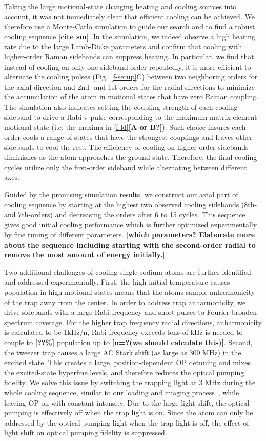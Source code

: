 \documentclass[aps,prl,twocolumn,groupedaddress]{revtex4-1}
\renewcommand{\fxnote}[1]{{\textbf{[#1]}}}
\begin{document}
Taking the large motional-state changing heating and cooling sources into account,
it was not immediately clear that efficient cooling can be achieved.
We therefore use a Monte-Carlo simulation to guide our search and
to find a robust cooling sequence \fxnote{cite sm}.
In the simulation, we indeed observe a high heating rate due to the large Lamb-Dicke parameters
and confirm that cooling with higher-order Raman sidebands can suppress heating.
In particular, we find that instead of cooling on only one sideband order repeatedly,
it is more efficient to alternate the cooling pulses (Fig.~\ref{f-setup}C) between two
neighboring orders for the axial direction and 2nd- and 1st-orders for the radial directions
to minimize the accumulation of the atom in motional states that have zero Raman coupling.
The simulation also indicates setting the coupling strength of each cooling sideband
to drive a Rabi $\pi$ pulse corresponding to the maximum matrix element motional state
(i.e. the maxima in \ref{f-ld}\fxnote{A or B?}).
Such choice insures each order cools a range of states that have the strongest
couplings and leaves other sidebands to cool the rest.
The efficiency of cooling on higher-order sidebands diminishes
as the atom approaches the ground state.
Therefore, the final cooling cycles utilize only the first-order sideband
while alternating between different axes.

Guided by the promising simulation results,
we construct our axial part of cooling sequence by starting at the highest
two observed cooling sidebands (8th- and 7th-orders)
and decreasing the orders after 6 to 15 cycles.
This sequence gives good initial cooling performance which is further optimized experimentally
by fine tuning of different parameters. \fxnote{which parameters? Elaborate more about the sequence including starting with the second-order radial to remove the most amount of energy initially.}

Two additional challenges of cooling single sodium atoms are
further identified and addressed experimentally.
First, the high initial temperature causes population in high motional states
means that the atoms sample anharmonicity of the trap away from the center.
In order to address trap anharmonicity, we drive sidebands with a large Rabi frequency
and short pulses to Fourier broaden spectrum coverage.
For the higher trap frequency radial directions, anharmonicity is calculated to be 1kHz/n,
Rabi frequency exceeds tens of kHz is needed to couple to \fxnote{??\%} population up to
\fxnote{n=?(we should calculate this)}.
Second, the  tweezer trap  causes a large AC Stark shift (as large as $300$ MHz)
in the excited state. This creates  a large, position-dependent OP detuning
and mixes the excited-state hyperfine levels, and therefore reduces the optical pumping fidelity.
We solve this issue by switching the trapping light at 3 MHz during the whole cooling sequence,
similar to our loading and imaging process~\cite{Hutzler2017-LightShifts},
while leaving OP on with constant intensity.
Due to the large light shift, the optical pumping is effectively off when the trap light is on.
Since the atom can only be addressed by the optical pumping light when the trap light is off,
the effect of light shift on optical pumping fidelity is suppressed.
\end{document}
